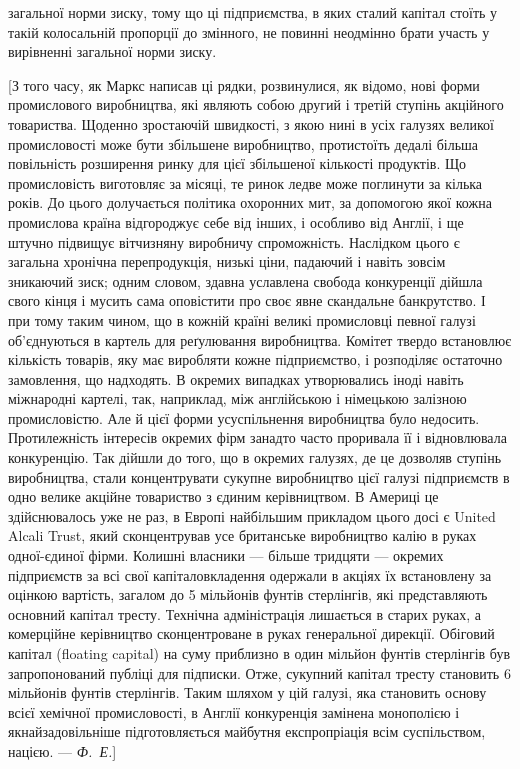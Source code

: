 \parcont{}  %
загальної норми зиску, тому що ці підприємства, в яких сталий
капітал стоїть у такій колосальній пропорції до змінного, не повинні неодмінно брати участь у
вирівненні загальної норми зиску.

[З того часу, як Маркс написав ці рядки, розвинулися, як
відомо, нові форми промислового виробництва, які являють
собою другий і третій ступінь акційного товариства. Щоденно
зростаючій швидкості, з якою нині в усіх галузях великої промисловості може бути збільшене
виробництво, протистоїть дедалі більша повільність розширення ринку для цієї збільшеної
кількості продуктів. Що промисловість виготовляє за місяці,
те ринок ледве може поглинути за кілька років. До цього долучається політика охоронних мит, за
допомогою якої кожна
промислова країна відгороджує себе від інших, і особливо від
Англії, і ще штучно підвищує вітчизняну виробничу спроможність.
Наслідком цього є загальна хронічна перепродукція, низькі ціни,
падаючий і навіть зовсім зникаючий зиск; одним словом, здавна
уславлена свобода конкуренції дійшла свого кінця і мусить
сама оповістити про своє явне скандальне банкрутство. І при
тому таким чином, що в кожній країні великі промисловці певної
галузі об’єднуються в картель для реґулювання виробництва.
Комітет твердо встановлює кількість товарів, яку має виробляти кожне підприємство, і розподіляє
остаточно замовлення,
що надходять. В окремих випадках утворювались іноді навіть
міжнародні картелі, так, наприклад, між англійською і німецькою залізною промисловістю. Але й цієї
форми усуспільнення
виробництва було недосить. Протилежність інтересів окремих
фірм занадто часто проривала її і відновлювала конкуренцію. Так дійшли до того, що в окремих
галузях, де це
дозволяв ступінь виробництва, стали концентрувати сукупне
виробництво цієї галузі підприємств в одно велике акційне товариство з єдиним керівництвом. В
Америці це здійснювалось
уже не раз, в Европі найбільшим прикладом цього досі є United
Alcali Trust, який сконцентрував усе британське виробництво
калію в руках одної-єдиної фірми. Колишні власники —
більше тридцяти — окремих підприємств за всі свої капіталовкладення одержали в акціях їх встановлену
за оцінкою
вартість, загалом до 5 мільйонів фунтів стерлінгів, які представляють основний капітал тресту.
Технічна адміністрація лишається в старих руках, а комерційне керівництво сконцентроване в руках
генеральної дирекції. Обіговий капітал (floating
capital) на суму приблизно в один мільйон фунтів стерлінгів був
запропонований публіці для підписки. Отже, сукупний капітал
тресту становить 6 мільйонів фунтів стерлінгів. Таким шляхом
у цій галузі, яка становить основу всієї хемічної промисловості,
в Англії конкуренція замінена монополією і якнайзадовільніше
підготовляється майбутня експропріація всім суспільством,
нацією. — \emph{Ф.~Е.}]

